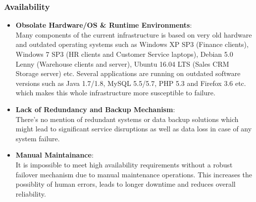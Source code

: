 \documentclass{llncs}
\begin{document}
\subsubsection*{Availability}
\begin{itemize}
  \item \textbf{Obsolate Hardware/OS \& Runtime Environments}:
        \\
        Many components of the current infrastructure is based on very old hardware and outdated operating systems such as 
        Windows XP SP3 (Finance clients), Windows 7 SP3 (HR clients and Customer Service laptops), Debian 5.0 Lenny (Warehouse clients and server),
        Ubuntu 16.04 LTS (Sales CRM Storage server) etc. Several applications are running on outdated software versions such as Java 1.7/1.8, 
        MySQL 5.5/5.7, PHP 5.3 and Firefox 3.6 etc. which makes this whole infrastructure more susceptible to failure.
        \\
  \item \textbf{Lack of Redundancy and Backup Mechanism}:
        \\ 
        There's no mention of redundant systems or data backup solutions which might lead to significant service disruptions as well as data loss in case of any system failure.
        \\
  \item \textbf{Manual Maintainance}:
        \\It is impossible to meet high availability requirements without a robust failover mechanism due to manual maintenance operations. 
        This increases the possiblity of human errors, leads to longer downtime and reduces overall reliability.
        \\
\end{itemize}
\end{document}
